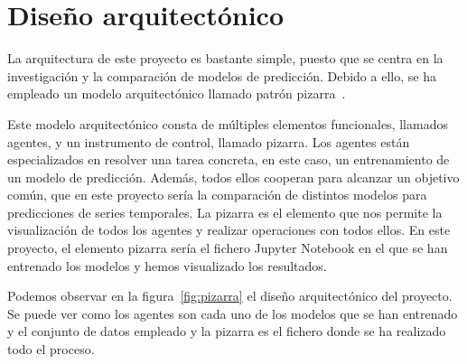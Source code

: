 \section{Diseño arquitectónico}

La arquitectura de este proyecto es bastante simple, puesto que se centra en la investigación y la comparación de modelos de predicción. Debido a ello, se ha empleado un modelo arquitectónico llamado patrón pizarra~\cite{pizarra}.

\par

Este modelo arquitectónico consta de múltiples elementos funcionales, llamados agentes, y un instrumento de control, llamado pizarra. Los agentes están especializados en resolver una tarea concreta, en este caso, un entrenamiento de un modelo de predicción. Además, todos ellos cooperan para alcanzar un objetivo común, que en este proyecto sería la comparación de distintos modelos para predicciones de series temporales. La pizarra es el elemento que nos permite la visualización de todos los agentes y realizar operaciones con todos ellos. En este proyecto, el elemento pizarra sería el fichero Jupyter Notebook en el que se han entrenado los modelos y hemos visualizado los resultados.

\par

Podemos observar en la figura~\ref{fig:pizarra} el diseño arquitectónico del proyecto. Se puede ver como los agentes son cada uno de los modelos que se han entrenado y el conjunto de datos empleado y la pizarra es el fichero donde se ha realizado todo el proceso.

